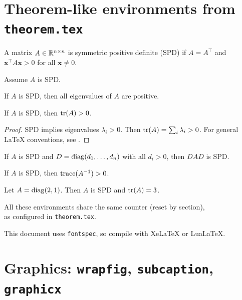 \documentclass[11pt,a4paper]{article}
\begin{document}
\section{Theorem-like environments from \texttt{theorem.tex}}

\begin{definition}
A matrix $A\in\mathbb{R}^{n\times n}$ is symmetric positive definite (SPD) if
$A=A^\top$ and $\bm{x}^\top A\bm{x}>0$ for all $\bm{x}\neq 0$.
\end{definition}

\begin{assumption}
Assume $A$ is SPD.
\end{assumption}

\begin{lemma}
If $A$ is SPD, then all eigenvalues of $A$ are positive.
\end{lemma}

\begin{theorem}
If $A$ is SPD, then $\operatorname{tr}(A)>0$.
\end{theorem}

\begin{proof}
SPD implies eigenvalues $\lambda_i>0$. Then $\operatorname{tr}(A)=\sum_i \lambda_i>0$.
For general LaTeX conventions, see \textcite{lamport1994}.
\end{proof}

\begin{proposition}
If $A$ is SPD and $D=\operatorname{diag}(d_1,\dots,d_n)$ with all $d_i>0$, then $DAD$ is SPD.
\end{proposition}

\begin{corollary}
If $A$ is SPD, then $\operatorname{trace}(A^{-1})>0$.
\end{corollary}

\begin{example}
Let $A=\operatorname{diag}(2,1)$. Then $A$ is SPD and $\operatorname{tr}(A)=3$.
\end{example}

\begin{remark}
All these environments share the same counter (reset by section), \\
as configured in \texttt{theorem.tex}.
\end{remark}

\begin{note}
This document uses \texttt{fontspec}, so compile with XeLaTeX or LuaLaTeX.
\end{note}

\section{Graphics: \texttt{wrapfig}, \texttt{subcaption}, \texttt{graphicx}}
\end{document}
